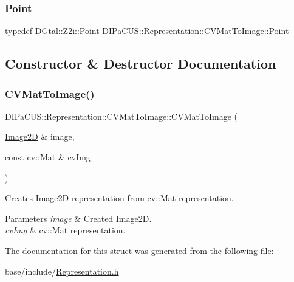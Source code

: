 \mbox{\label{structDIPaCUS_1_1Representation_1_1CVMatToImage_ac277d341558772f06247220cbdca4118}} 
\subsubsection{\texorpdfstring{Point}{Point}}
{\footnotesize\ttfamily typedef D\+Gtal\+::\+Z2i\+::\+Point \mbox{\hyperlink{structDIPaCUS_1_1Representation_1_1CVMatToImage_ac277d341558772f06247220cbdca4118}{D\+I\+Pa\+C\+U\+S\+::\+Representation\+::\+C\+V\+Mat\+To\+Image\+::\+Point}}}



\subsection{Constructor \& Destructor Documentation}
\mbox{\label{structDIPaCUS_1_1Representation_1_1CVMatToImage_a84778cfc56aa2ea2e2aef0c30a8fd0f4}} 
\subsubsection{\texorpdfstring{C\+V\+Mat\+To\+Image()}{CVMatToImage()}}
{\footnotesize\ttfamily D\+I\+Pa\+C\+U\+S\+::\+Representation\+::\+C\+V\+Mat\+To\+Image\+::\+C\+V\+Mat\+To\+Image (\begin{DoxyParamCaption}\item[{\mbox{\hyperlink{structDIPaCUS_1_1Representation_1_1CVMatToImage_a3e6b8dea7273472226dfb9d161e7ee26}{Image2D}} \&}]{image,  }\item[{const cv\+::\+Mat \&}]{cv\+Img }\end{DoxyParamCaption})}



Creates Image2D representation from cv\+::\+Mat representation. 


\begin{DoxyParams}{Parameters}
{\em image} & Created Image2D. \\
\hline
{\em cv\+Img} & cv\+::\+Mat representation. \\
\hline
\end{DoxyParams}


The documentation for this struct was generated from the following file\+:\begin{DoxyCompactItemize}
\item 
base/include/\mbox{\hyperlink{Representation_8h}{Representation.\+h}}\end{DoxyCompactItemize}
